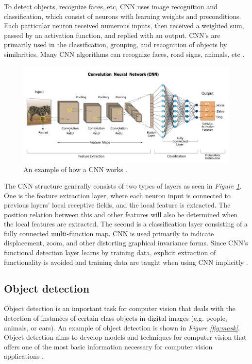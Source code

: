 To detect objects, recognize faces, etc, CNN uses image recognition and classification, which consist of neurons with learning weights and preconditions. Each particular neuron received numerous inputs, then received a weighted sum, passed by an activation function, and replied with an output. CNN's are primarily used in the classification, grouping, and recognition of objects by similarities. Many CNN algorithms can recognize faces, road signs, animals, etc \cite{bansari_introduction_2019}.

\begin{figure}[h]
  \centering
  \includegraphics[width=1\textwidth]{graphics/methods/cnn.png}
  \caption{An example of how a CNN works \cite{swapna_convolutional_2020}.}
  \label{fig:cnn}
\end{figure}

The CNN structure generally consists of two types of layers as seen in \textit{Figure \ref{fig:cnn}}. One is the feature extraction layer, where each neuron input is connected to previous layers' local receptive fields, and the local feature is extracted. 
The position relation between this and other features will also be determined when the local features are extracted. The second is a classification layer consisting of a fully connected multi-function map.
CNN is used primarily to indicate displacement, zoom, and other distorting graphical invariance forms. 
Since CNN's functional detection layer learns by training data, explicit extraction of functionality is avoided and training data are taught when using CNN implicitly \cite{liu_implementation_2015}. %




\subsection{Object detection}
Object detection is an important task for computer vision that deals with the detection of instances of certain class objects in digital images (e.g. people, animals, or cars). An example of object detection is shown in \textit{Figure \ref{fig:mask}}. Object detection aims to develop models and techniques for computer vision that offers one of the most basic information necessary for computer vision applications \cite{zou_object_2019}. %

